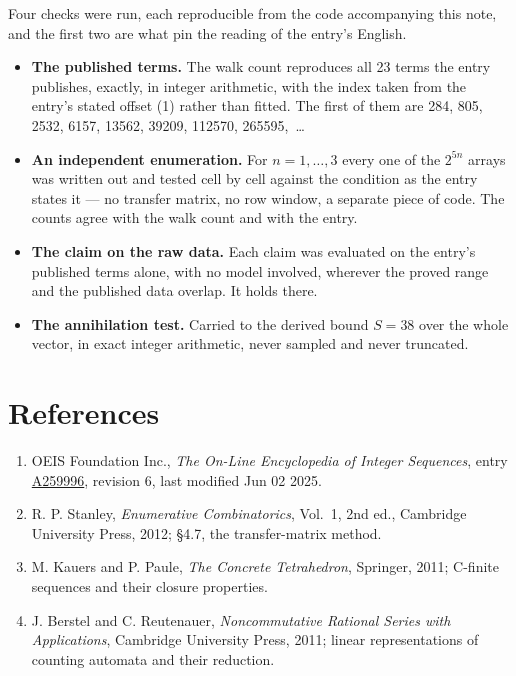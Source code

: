 \documentclass[11pt]{article}
\theoremstyle{definition}
\begin{document}
Four checks were run, each reproducible from the code accompanying this note, and the first two are what pin the reading of the entry's English.

\begin{itemize}

\item {\bfseries The published terms.} The walk count reproduces all 23 terms the entry publishes, exactly, in integer arithmetic, with the index taken from the entry's stated offset (1) rather than fitted. The first of them are 284, 805, 2532, 6157, 13562, 39209, 112570, 265595,~\dots

\item {\bfseries An independent enumeration.} For $n = 1,\dots,3$ every one of the $2^{5n}$ arrays was written out and tested cell by cell against the condition as the entry states it --- no transfer matrix, no row window, a separate piece of code. The counts agree with the walk count and with the entry.

\item {\bfseries The claim on the raw data.} Each claim was evaluated on the entry's published terms alone, with no model involved, wherever the proved range and the published data overlap. It holds there.

\item {\bfseries The annihilation test.} Carried to the derived bound $S = 38$ over the whole vector, in exact integer arithmetic, never sampled and never truncated.

\end{itemize}

\section{References}

\begin{enumerate}

\item OEIS Foundation Inc., \emph{The On-Line Encyclopedia of Integer Sequences}, entry \href{https://oeis.org/A259996}{A259996}, revision 6, last modified Jun 02 2025.

\item R. P. Stanley, \emph{Enumerative Combinatorics}, Vol.~1, 2nd ed., Cambridge University Press, 2012; \S4.7, the transfer-matrix method.

\item M. Kauers and P. Paule, \emph{The Concrete Tetrahedron}, Springer, 2011; C-finite sequences and their closure properties.

\item J. Berstel and C. Reutenauer, \emph{Noncommutative Rational Series with Applications}, Cambridge University Press, 2011; linear representations of counting automata and their reduction.

\end{enumerate}
\end{document}
